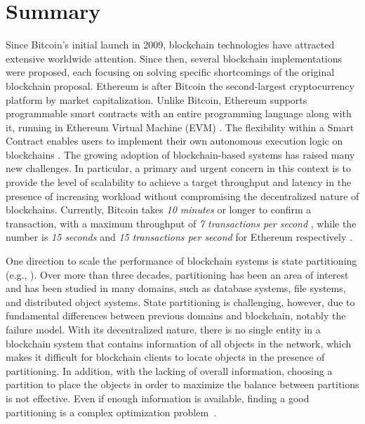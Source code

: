\newpage
\section{Summary}
Since Bitcoin's initial launch in 2009, blockchain technologies have attracted
extensive worldwide attention. Since then, several blockchain implementations
were proposed, each focusing on solving specific shortcomings of the original
blockchain proposal. Ethereum is after Bitcoin the second-largest cryptocurrency
platform by market capitalization. Unlike Bitcoin, Ethereum supports programmable
smart contracts with an entire programming language along with it, running in
Ethereum Virtual Machine (EVM) \cite{ethereum:evm}. The flexibility within a
Smart Contract enables users to implement their own autonomous execution logic
on blockchains \cite{delmolino2016step, buterin2014next, kosba2016hawk}. The
growing adoption of blockchain-based systems has raised many new challenges. In
particular, a primary and urgent concern in this context is to provide the level
of scalability to achieve a target throughput and latency in the presence of
increasing workload without compromising the decentralized nature of
blockchains. Currently, Bitcoin takes \emph{10 minutes} or longer to confirm a transaction,
with a maximum throughput of \emph{7 transactions per second}
\cite{nakamoto2019bitcoin}, while the number is \emph{15 seconds} and \emph{15
transactions per second} for Ethereum respectively \cite{ethereum:sharding}. 

One direction to scale the performance of blockchain systems is state
partitioning (e.g., \cite{facebookTAO, sciascia2012sdur, aguilera2007sinfonia}).
Over more than three decades, partitioning has been an area of interest and has
been studied in many domains, such as database systems, file systems, and
distributed object systems. State partitioning is challenging, however, due to fundamental
differences between previous domains and blockchain, notably the failure model. With its
decentralized nature, there is no single entity in a blockchain system that contains
information of all objects in the network, which makes it difficult for
blockchain clients to locate objects in the presence of partitioning. In
addition, with the lacking of overall information, choosing a partition to place
the objects in order to maximize the balance between partitions is not
effective. Even if enough information is available, finding a good partitioning
is a complex optimization problem~\cite{curino2010sch,taft2014est}.

